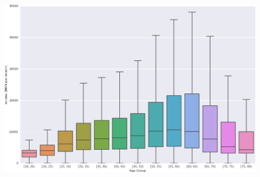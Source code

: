 \begin{figure}[]
\begin{center}
\includegraphics[width=1\columnwidth]{figures/income_age_boxplot4/income_age_boxplot4.png}
\caption{ \protect}
\end{center}
\end{figure}





{}


